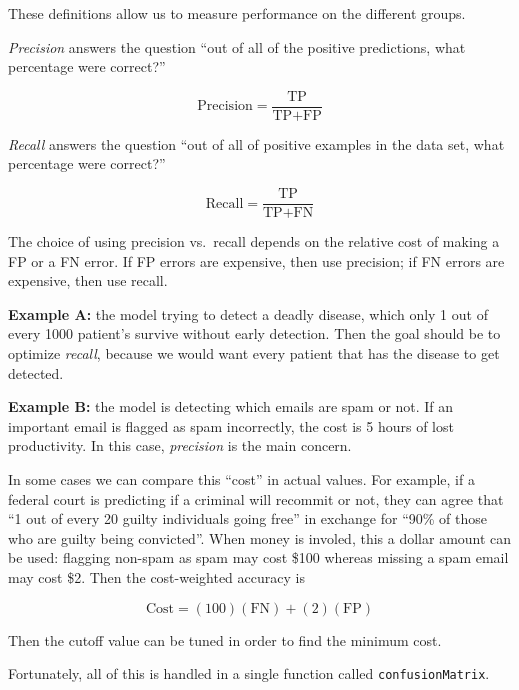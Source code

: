 \documentclass[openany]{book}
\newenvironment{Shaded}{\begin{snugshade}}{\end{snugshade}}
\newcommand{\KeywordTok}[1]{\textcolor[rgb]{0.13,0.29,0.53}{\textbf{#1}}}
\newcommand{\NormalTok}[1]{#1}
\newcommand{\OperatorTok}[1]{\textcolor[rgb]{0.81,0.36,0.00}{\textbf{#1}}}
\begin{document}
These definitions allow us to measure performance on the different groups.

\emph{Precision} answers the question ``out of all of the positive predictions, what percentage were correct?''

\[\text{Precision} = \frac{\text{TP}}{\text{TP} + \text{FP}}\]

\emph{Recall} answers the question ``out of all of positive examples in the data set, what percentage were correct?''

\[\text{Recall} = \frac{\text{TP}}{\text{TP} + \text{FN}}\]

The choice of using precision vs.~recall depends on the relative cost of making a FP or a FN error. If FP errors are expensive, then use precision; if FN errors are expensive, then use recall.

\textbf{Example A:} the model trying to detect a deadly disease, which only 1 out of every 1000 patient's survive without early detection. Then the goal should be to optimize \emph{recall}, because we would want every patient that has the disease to get detected.

\textbf{Example B:} the model is detecting which emails are spam or not. If an important email is flagged as spam incorrectly, the cost is 5 hours of lost productivity. In this case, \emph{precision} is the main concern.

In some cases we can compare this ``cost'' in actual values. For example, if a federal court is predicting if a criminal will recommit or not, they can agree that ``1 out of every 20 guilty individuals going free'' in exchange for ``90\% of those who are guilty being convicted''. When money is involed, this a dollar amount can be used: flagging non-spam as spam may cost \$100 whereas missing a spam email may cost \$2. Then the cost-weighted accuracy is

\[\text{Cost} = (100)(\text{FN}) + (2)(\text{FP})\]

Then the cutoff value can be tuned in order to find the minimum cost.

Fortunately, all of this is handled in a single function called \texttt{confusionMatrix}.

\begin{Shaded}
\end{Shaded}
\end{document}
